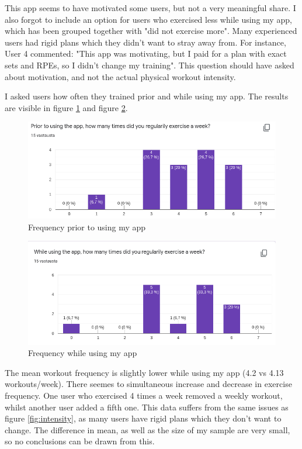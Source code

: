 \documentclass{l4proj}
\begin{document}
This app seems to have motivated some users, but not a very meaningful share. I also forgot to include an option for users who exercised less while using my app, which has been grouped together with "did not exercise more". Many experienced users had rigid plans which they didn't want to stray away from. For instance, User 4 commented: "This app was motivating, but I paid for a plan with exact sets and RPEs, so I didn't change my training". This question should have asked about motivation, and not the actual physical workout intensity.

I asked users how often they trained prior and while using my app. The results are visible in figure \ref{fig:prior_frequency} and figure \ref{fig:while_frequency}.
\begin{figure}[H]
    \centering
    \includegraphics[width=1.0\linewidth]{prior_frequency.png}    
    \caption{Frequency prior to using my app}
    \label{fig:prior_frequency} 
\end{figure}

\begin{figure}[H]
    \centering
    \includegraphics[width=1.0\linewidth]{while_frequency.png}    
    \caption{Frequency while using my app}
    \label{fig:while_frequency} 
\end{figure}

The mean workout frequency is slightly lower while using my app (4.2 vs 4.13 workouts/week). There seemes to simultaneous increase and decrease in exercise frequency. One user who exercised 4 times a week removed a weekly workout, whilst another user added a fifth one. This data suffers from the same issues as figure \ref{fig:intensity}, as many users have rigid plans which they don't want to change. The difference in mean, as well as the size of my sample are very small, so no conclusions can be drawn from this.
\end{document}
